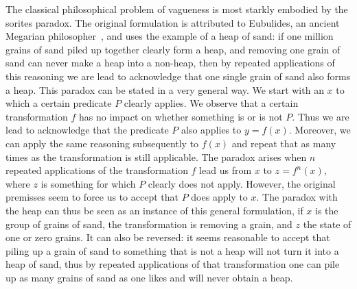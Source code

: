 \documentclass[a4paper]{article}
\begin{document}
The classical philosophical problem of vagueness is most starkly embodied by the sorites paradox.
The original formulation is attributed to Eubulides, an ancient Megarian philosopher~\parencite{sorensen_sorites_2009}, and uses the example of a heap of sand: if one million grains of sand piled up together clearly form a heap, and removing one grain of sand can never make a heap into a non-heap, then by repeated applications of this reasoning we are lead to acknowledge that one single grain of sand also forms a heap.
This paradox can be stated in a very general way.
We start with an $x$ to which a certain predicate $P$ clearly applies.
We observe that a certain transformation $f$ has no impact on whether something is or is not $P$.
Thus we are lead to acknowledge that the predicate $P$ also applies to $y = f(x)$.
Moreover, we can apply the same reasoning subsequently to $f(x)$ and repeat that as many times as the transformation is still applicable.
The paradox arises when $n$ repeated applications of the transformation $f$ lead us from $x$ to $z = f^n(x)$, where $z$ is something for which $P$ clearly does not apply.
However, the original premisses seem to force us to accept that $P$ does apply to $x$.
The paradox with the heap can thus be seen as an instance of this general formulation, if $x$ is the group of grains of sand, the transformation is removing a grain, and $z$ the state of one or zero grains.
It can also be reversed: it seems reasonable to accept that piling up a grain of sand to something that is not a heap will not turn it into a heap of sand, thus 
by repeated applications of that transformation one can pile up as many grains of sand as one likes and will never obtain a heap.
\end{document}
